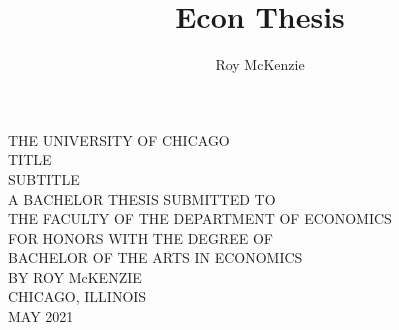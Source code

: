 \documentclass{article}
\title{Econ Thesis}
\author{Roy McKenzie}
\begin{document}


\begin{titlepage}
\begin{center}
THE    UNIVERSITY    OF    CHICAGO
\\[1.5in]

TITLE
\\SUBTITLE
\\[1in]

A    BACHELOR    THESIS    SUBMITTED    TO    \\
\bigskip
THE    FACULTY    OF    THE    DEPARTMENT    OF    ECONOMICS    \\
\bigskip
FOR    HONORS    WITH    THE    DEGREE    OF    \\
\bigskip
BACHELOR    OF    THE    ARTS    IN    ECONOMICS
\\[1.5in]

BY ROY McKENZIE
\\[1in]
CHICAGO, ILLINOIS \\
MAY 2021

\end{center}
\end{titlepage}
\end{document}
